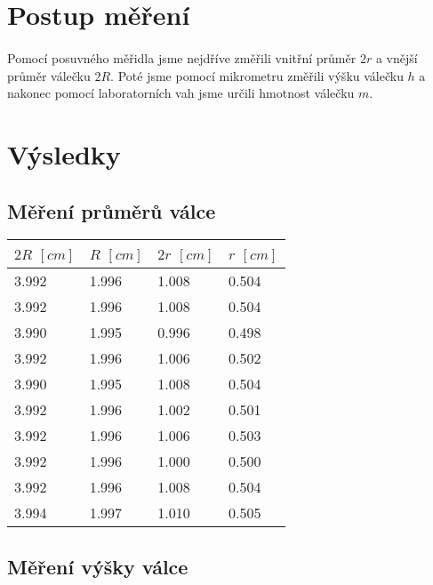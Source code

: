 \documentclass[a4paper,11pt]{article}
\begin{document}
\section{Postup měření}

    \paragraph{} Pomocí posuvného měřidla jsme nejdříve změřili vnitřní průměr $2r$ a vnější průměr
    válečku $2R$. Poté jsme pomocí mikrometru změřili výšku válečku $h$ a nakonec pomocí laboratorních vah jsme
    určili hmotnost válečku $m$.

\section{Výsledky}

    \subsection{Měření průměrů válce}

    \begin{center}
        \begin{tabular}{ | l | l || l | l | }
            \hline
            $2R$ $[cm]$ & $R$ $[cm]$ & $2r$ $[cm]$ & $r$ $[cm]$ \\ \hline
            3.992 & 1.996 & 1.008 & 0.504 \\ \hline
            3.992 & 1.996 & 1.008 & 0.504 \\ \hline
            3.990 & 1.995 & 0.996 & 0.498 \\ \hline
            3.992 & 1.996 & 1.006 & 0.502 \\ \hline
            3.990 & 1.995 & 1.008 & 0.504 \\ \hline
            3.992 & 1.996 & 1.002 & 0.501 \\ \hline
            3.992 & 1.996 & 1.006 & 0.503 \\ \hline
            3.992 & 1.996 & 1.000 & 0.500 \\ \hline
            3.992 & 1.996 & 1.008 & 0.504 \\ \hline
            3.994 & 1.997 & 1.010 & 0.505 \\
            \hline
        \end{tabular}
    \end{center}

    \subsection{Měření výšky válce}
\end{document}

